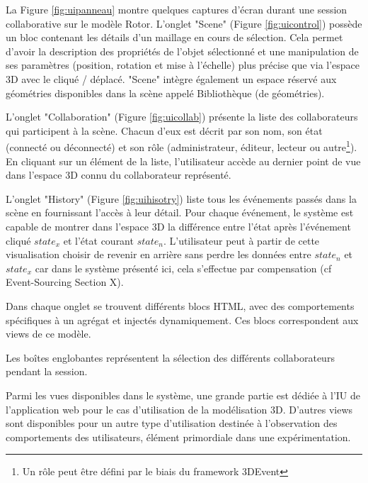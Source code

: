 La Figure \ref{fig:uipanneau} montre quelques captures d'écran durant une 
session collaborative sur le modèle Rotor. L'onglet "Scene" (Figure 
\ref{fig:uicontrol}) possède un bloc contenant les détails 
d'un 
maillage en cours de 
sélection. Cela permet d'avoir la description des propriétés de l'objet sélectionné et 
une manipulation de ses paramètres (position, rotation et mise à l'échelle) plus 
précise que via l'espace \gls{3D} avec le cliqué / déplacé. "Scene" intègre 
également un espace réservé aux géométries disponibles dans la scène appelé 
Bibliothèque (de géométries).

L'onglet "Collaboration" (Figure \ref{fig:uicollab}) présente la liste des 
collaborateurs qui 
participent à la 
scène. Chacun d'eux est décrit par son nom, son état  (connecté ou déconnecté) 
et son rôle (administrateur, éditeur, lecteur ou autre\footnote{Un rôle peut être 
	défini par le biais du \gls{framework} 3DEvent}). En cliquant sur un élément de 
	la 
liste, l'utilisateur accède au dernier point de vue dans l'espace \gls{3D} connu du 
collaborateur représenté.

L'onglet "History" (Figure \ref{fig:uihisotry}) liste tous les événements passés dans 
la 
scène en fournissant 
l'accès à leur détail. Pour chaque événement, le système est capable de montrer 
dans l'espace \gls{3D} la différence entre l'état  après l'événement cliqué $state_x$ 
et l'état courant $state_n$. L'utilisateur peut à partir de cette visualisation choisir 
de \og revenir en arrière\fg{} sans perdre les données entre $state_n$ et $state_x$ 
car dans le système présenté ici, cela s'effectue par compensation (cf 
Event-Sourcing 
Section X).

Dans chaque onglet se trouvent différents blocs \gls{HTML}, avec des 
comportements spécifiques à un agrégat et injectés dynamiquement. Ces blocs 
correspondent aux views de ce modèle.

Les boîtes englobantes représentent la sélection des différents collaborateurs 
pendant la session.

Parmi les vues disponibles dans le système, une grande partie est dédiée à 
l'\gls{IU} de l'application web pour le cas d'utilisation de la modélisation 3D. 
D'autres views sont disponibles pour un autre type d'utilisation destinée à 
l'observation des comportements des utilisateurs, élément primordiale dans 
une expérimentation.




